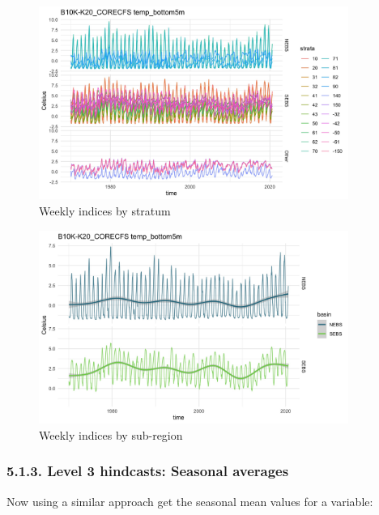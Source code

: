 \documentclass[
]{article}
\begin{document}
\begin{figure}
\centering
\includegraphics[width=0.9\textwidth,height=\textheight]{Figs/hind_weekly_bystrata.jpg}
\caption{Weekly indices by stratum}
\end{figure}

\begin{figure}
\centering
\includegraphics[width=0.9\textwidth,height=\textheight]{Figs/hind_weekly_byreg.jpg}
\caption{Weekly indices by sub-region}
\end{figure}

\hypertarget{level-3-hindcasts-seasonal-averages}{%
\subsubsection{5.1.3. Level 3 hindcasts: Seasonal
averages}\label{level-3-hindcasts-seasonal-averages}}

Now using a similar approach get the seasonal mean values for a
variable:
\end{document}
